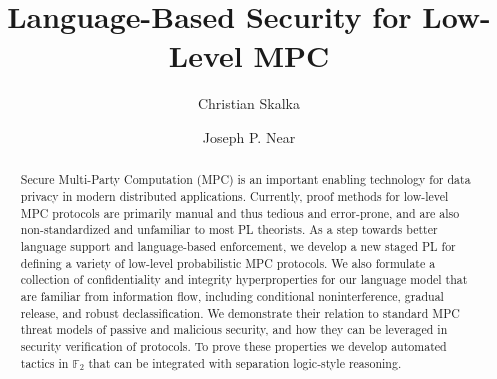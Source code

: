 \documentclass[sigconf]{acmart}
\begin{document}
\title{Language-Based Security for Low-Level MPC}

\author{Christian Skalka}

\author{Joseph P. Near}

\begin{abstract}
  Secure Multi-Party Computation (MPC) is an important
  enabling technology for data privacy in modern distributed
  applications. Currently, proof methods for low-level MPC protocols
  are primarily manual and thus tedious and error-prone, and are also
  non-standardized and unfamiliar to most PL theorists. As a step
  towards better language support and language-based enforcement, we
  develop a new staged PL for defining a variety of low-level
  probabilistic MPC protocols. We also formulate a collection of
  confidentiality and integrity hyperproperties for our language model
  that are familiar from information flow, including conditional
  noninterference, gradual release, and robust declassification. We
  demonstrate their relation to standard MPC threat models of passive
  and malicious security, and how they can be leveraged in security
  verification of protocols. To prove these properties we develop
  automated tactics in $\mathbb{F}_2$ that can be integrated with
  separation logic-style reasoning.
\end{abstract}

\begin{comment}
\begin{CCSXML}
<ccs2012>
   <concept>
       <concept_id>10002978.10002986.10002990</concept_id>
       <concept_desc>Security and privacy~Logic and verification</concept_desc>
       <concept_significance>500</concept_significance>
       </concept>
   <concept>
       <concept_id>10003752.10003753.10003757</concept_id>
       <concept_desc>Theory of computation~Probabilistic computation</concept_desc>
       <concept_significance>300</concept_significance>
       </concept>
   <concept>
       <concept_id>10003752.10003790.10003806</concept_id>
       <concept_desc>Theory of computation~Programming logic</concept_desc>
       <concept_significance>500</concept_significance>
       </concept>
 </ccs2012>
\end{CCSXML}

\ccsdesc[500]{Security and privacy~Logic and verification}
\ccsdesc[500]{Theory of computation~Probabilistic computation}
\ccsdesc[500]{Theory of computation~Programming logic}


\keywords{Secure multiparty computation, security verification, probabilistic programming, programming languages, information flow.}
\end{comment}
\end{document}
